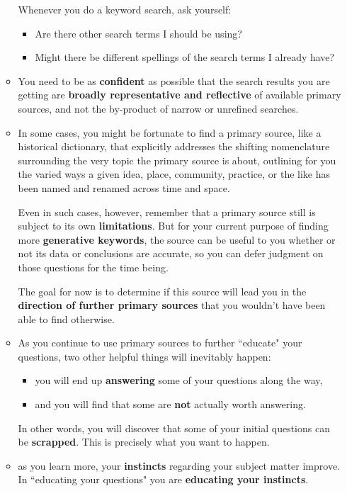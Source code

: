 \documentclass[11pt]{article}
\begin{document}
\begin{itemize}
\begin{exercise}
\begin{itemize}
Whenever you do a keyword search, ask yourself:
\begin{itemize}
\item Are there other search terms I should be using?
\item Might there be different spellings of the search terms I already have?
\end{itemize} 

\item You need to be as \textbf{confident} as possible that the search results you are getting are \textbf{broadly representative and reflective} of available primary sources, and not the by-product of narrow or unrefined searches. 

\item In some cases, you might be fortunate to find a primary source, like a historical dictionary, that explicitly addresses the shifting nomenclature surrounding the very topic the primary source is about, outlining for you the varied ways a given idea, place, community, practice, or the like has been named and renamed across time and space. 

Even in such cases, however, remember that a primary source still is subject to its own \textbf{limitations}. But for your current purpose of finding more \textbf{generative keywords}, the source can be useful to you whether or not its data or conclusions are accurate, so you can defer judgment on those questions for the time being. 

The goal for now is to determine if this source will lead you in the \textbf{direction of further primary sources} that you wouldn’t have been able to find otherwise.

\item As you continue to use primary sources to further ``educate" your questions, two other helpful things will inevitably happen: 
\begin{itemize}
\item you will end up \textbf{answering} some of your questions along the way, 
\item and you will find that some are \textbf{not} actually worth answering.
\end{itemize} In other words, you will discover that some of your initial questions can be \textbf{scrapped}. This is precisely what you want to happen.

\item as you learn more, your \textbf{instincts} regarding your subject matter improve. In ``educating your questions" you are \textbf{educating your instincts}.
\end{itemize}
\end{exercise}


\end{itemize}
\end{document}
